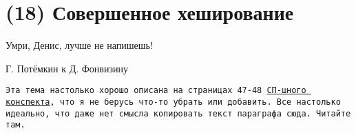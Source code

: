 \section{(18) Совершенное хеширование}

\epigraph{Умри, Денис, лучше не напишешь!}{Г. Потёмкин к Д. Фонвизину}

\texttt{Эта тема настолько хорошо описана на страницах 47-48 \href{https://bsse.compscicenter.ru/wiki/images/b/b6/Algorithms_I.pdf}{СП-шного конспекта}, что я не берусь что-то убрать или добавить. Все настолько идеально, что даже нет смысла копировать текст параграфа сюда. Читайте там.}